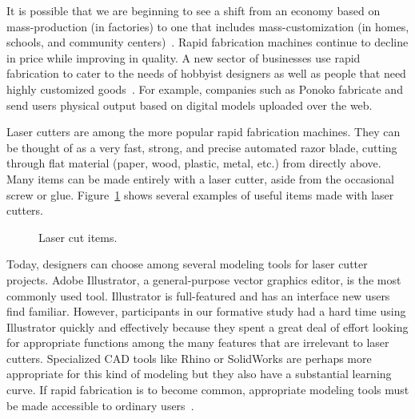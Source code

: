 \documentclass{article}
\begin{document}
It is possible that we are beginning to see a shift from an economy
based on mass-production (in factories) to one that includes
mass-customization (in homes, schools, and community
centers)~\cite{economist-fab}. Rapid fabrication machines continue to
decline in price while improving in quality. A new sector of
businesses use rapid fabrication to cater to the needs of hobbyist
designers as well as people that need highly customized
goods~\cite{nyt-rapidfab}.  For example, companies such as Ponoko
fabricate and send users physical output based on digital models
uploaded over the web.

Laser cutters are among the more popular rapid fabrication
machines. They can be thought of as a very fast, strong, and precise
automated razor blade, cutting through flat material (paper, wood,
plastic, metal, etc.) from directly above. Many items can be made
entirely with a laser cutter, aside from the occasional screw or glue.
Figure~\ref{fig:laser-example} shows several examples of useful items
made with laser cutters.

\begin{figure}[h]
\centering 
{}
\caption{Laser cut items.}
\label{fig:laser-example}
\end{figure}

Today, designers can choose among several modeling tools for laser
cutter projects. Adobe Illustrator, a general-purpose vector graphics
editor, is the most commonly used tool. Illustrator is full-featured
and has an interface new users find familiar. However, participants in
our formative study had a hard time using Illustrator quickly and
effectively because they spent a great deal of effort looking for
appropriate functions among the many features that are irrelevant to
laser cutters. Specialized CAD tools like Rhino or SolidWorks are
perhaps more appropriate for this kind of modeling but they also have
a substantial learning curve. If rapid fabrication is to become
common, appropriate modeling tools must be made accessible to ordinary
users~\cite{lipson-homefactory}.
\end{document}
